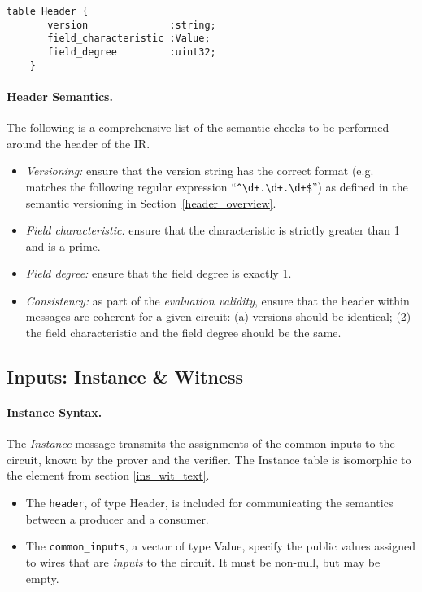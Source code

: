 \begin{lstlisting}[style=fbslisting]
    table Header {
       version              :string;
       field_characteristic :Value;
       field_degree         :uint32;
    }
\end{lstlisting}

\paragraph{Header Semantics.} The following is a comprehensive list of the semantic checks to be performed around the header of the IR.
\begin{itemize}
    \item \textit{Versioning:} ensure that the version string has the correct format (e.g. matches the following regular expression ``\verb|^\d+.\d+.\d+$|'') as defined in the semantic versioning in Section~\ref{header_overview}.
    \item \textit{Field characteristic:} ensure that the characteristic is strictly greater than 1 and is a prime.
    \item \textit{Field degree:} ensure that the field degree is exactly 1.
    \item \textit{Consistency:} as part of the \emph{evaluation validity}, ensure that the header within messages are coherent for a given circuit: (a) versions should be identical; (2) the field characteristic and the field degree should be the same.
\end{itemize}

\subsection{Inputs: Instance \& Witness}

\paragraph{Instance Syntax.} The \textit{Instance} message transmits the assignments of the common inputs to the circuit, known by the prover and the verifier. The \textsf{Instance} table is isomorphic to the  element from section \ref{ins_wit_text}.

\begin{itemize}
    \item The \texttt{header}, of type \textsf{Header}, is included for communicating the semantics between a producer and a consumer.
    \item The \texttt{common\_inputs}, a vector of type \textsf{Value}, specify the public values assigned to wires that are \emph{inputs} to the circuit.  It must be non-null, but may be empty.
\end{itemize}

